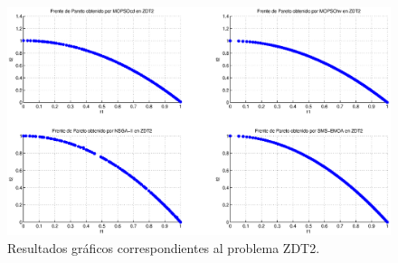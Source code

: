 \clearpage
\newpage
\begin{figure}
      \begin{center}
	  \includegraphics[scale=0.45]{Cap4/rzdt2r.eps}
      \end{center}
	\caption{Resultados gr\'aficos correspondientes al problema ZDT2.}
      \label{fig:rZDT2}
      \end{figure}
\clearpage
\newpage
